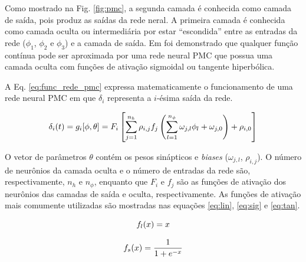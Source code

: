 Como mostrado na Fig. \ref{fig:pmc}, a segunda camada é conhecida como camada
de saída, pois produz as saídas da rede neral. A primeira camada é conhecida
como camada oculta ou intermediária por estar ``escondida'' entre as entradas da
rede ($\phi_1$, $\phi_2$ e $\phi_3$) e a camada de saída. Em
 foi demonstrado que qualquer função contínua pode ser
aproximada por uma rede neural PMC que possua uma camada oculta com funções de
ativação sigmoidal ou tangente hiperbólica.

A Eq. \ref{eq:func_rede_pmc} expressa matematicamente o funcionamento de uma
rede neural PMC em que $\delta_i$ representa a $i$-ésima saída da rede.

\begin{equation}\label{eq:func_rede_pmc}
\delta_i(t) = g_i[\phi,\theta] =
              F_i\left[\sum_{j=1}^{n_h}\rho_{i,j}f_j
              \left(\sum_{l=1}^{n_\phi}\omega_{j,l}\phi_l+\omega_{j,0}\right)+
              \rho_{i,0}\right]
\end{equation}

O vetor de parâmetros $\theta$ contém os pesos sinápticos e {\it biases}
($\omega_{j,l}$, $\rho_{i,j}$). O número de neurônios da camada oculta e o
número de entradas da rede são, respectivamente, $n_h$ e $n_\phi$, enquanto que
$F_i$ e $f_j$ são as funções de ativação dos neurônios das camadas de saída e
oculta, respectivamente. As funções de ativação mais comumente utilizadas são
mostradas nas equações \ref{eq:lin}, \ref{eq:sig} e \ref{eq:tan}.

\begin{equation}
\label{eq:lin}
f_l(x)=x \\
\end{equation} 


\begin{equation}
\label{eq:sig}
f_s(x) = \frac{1}{1+e^{-x}}\\
\end{equation} 

